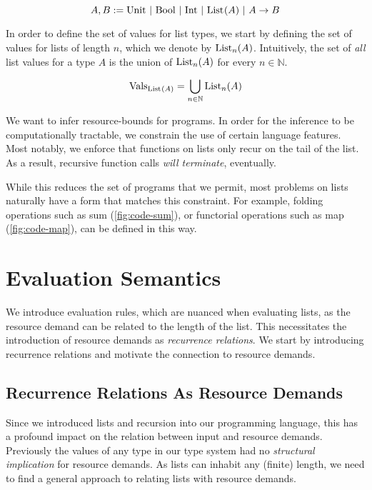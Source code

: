 \begin{definition}\label{def:type-system-6}
   \[
      A, B := \text{Unit}~|~\text{\text{Bool}}~|~\text{\text{Int}}~|~\text{List}^{}(A)~|~A \to B ^{}_{}
   \]
\end{definition}

In order to define the set of values for list types, we start by defining the set of values for lists of length \(n\), which we denote by \(\text{List}_{n}(A)\). Intuitively, the set of \emph{all} list values for a type \(A\) is the union of \(\text{List}_{n}(A)\) for every \(n \in \mathbb{N}\). 

\begin{definition}
   \begin{displaymath}
      \text{Vals}_{\text{List}^{}(A)} = \bigcup_{n \in \mathbb{N}} \text{List}_{n}(A)
   \end{displaymath}
\end{definition}


We want to infer resource-bounds for programs. In order for the inference to be computationally tractable, we constrain the use of certain language features. Most notably, we enforce that functions on lists only recur on the tail of the list. As a result, recursive function calls \emph{will terminate}, eventually.

While this reduces the set of programs that we permit, most problems on lists naturally have a form that matches this constraint. For example, folding operations such as sum (\cref{fig:code-sum}), or functorial operations such as map (\cref{fig:code-map}), can be defined in this way. 


\section{Evaluation Semantics}

We introduce evaluation rules, which are nuanced when evaluating lists, as the resource demand can be related to the length of the list. This necessitates the introduction of resource demands as \emph{recurrence relations}. We start by introducing recurrence relations and motivate the connection to resource demands. 

\subsection{Recurrence Relations As Resource Demands}\label{sec:recurrence-relation}

Since we introduced lists and recursion into our programming language, this has a profound impact on the relation between input and resource demands. Previously the values of any type in our type system had no \emph{structural implication} for resource demands. As lists can inhabit any (finite) length, we need to find a general approach to relating lists with resource demands. 

